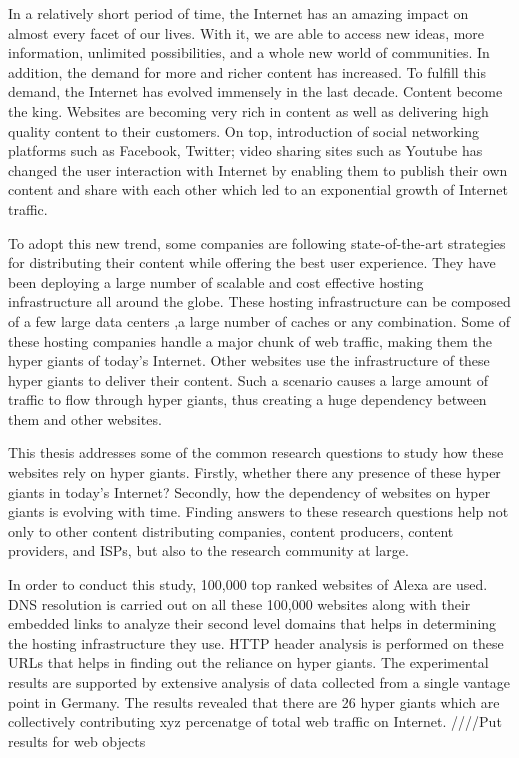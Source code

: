 In a relatively short period of time, the Internet has an amazing impact on almost every facet of our lives. With it, we are able to access new ideas, more information, unlimited possibilities, and a whole new world of communities. In addition, the demand for more and richer content has increased. To fulfill this demand, the Internet has evolved immensely in the last decade. Content become the king. Websites are becoming very rich in content as well as delivering high quality content to their customers. On top, introduction of social networking platforms such as Facebook, Twitter; video sharing sites such as Youtube has changed the user interaction with Internet by enabling them to publish their own content and share with each other which led to an exponential growth of Internet traffic. 

To adopt this new trend, some companies are following state-of-the-art strategies for distributing their content while offering the best user experience. They have been deploying a large number of scalable and cost effective hosting infrastructure all around the globe. These hosting infrastructure can be composed of a few large data centers ,a large number of caches or any combination. Some of these hosting companies handle a major chunk of web traffic, making them the hyper giants of today's Internet. Other websites use the infrastructure of these hyper giants to deliver their content. Such a scenario causes a large amount of traffic to flow through hyper giants, thus creating a huge dependency between them and other websites.

This thesis addresses some of the common research questions to study how these websites rely on hyper giants. Firstly, whether there any presence of these hyper giants in today's Internet? Secondly, how the dependency of websites on hyper giants is evolving with time. Finding answers to these research questions help not only to other content distributing companies, content producers, content providers, and ISPs, but also to the research community at large. 

In order to conduct this study, 100,000 top ranked websites of Alexa are used. DNS resolution is carried out on all these 100,000 websites along with their embedded links to analyze their second level domains that helps in determining the hosting infrastructure they use. HTTP header analysis is performed on these URLs that helps in finding out the reliance on hyper giants. The experimental results are supported by extensive analysis of data collected from a single vantage point in Germany. The results revealed that there are 26 hyper giants which are collectively contributing  xyz percenatge of total web traffic on Internet. ////Put results for web objects




